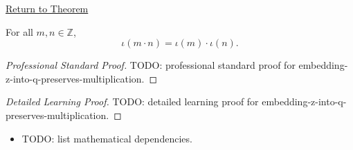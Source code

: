 \newpage
{}
\label{prf:embedding-z-into-q-preserves-multiplication}

\begin{remark*}[Return]
\hyperref[thm:embedding-z-into-q-preserves-multiplication]{Return to Theorem}
\end{remark*}

\begin{theorem*}
For all $m,n\in\mathbb{Z}$,
\[
\iota(m\cdot n)=\iota(m)\cdot\iota(n).
\]
\end{theorem*}

\begin{proof}[Professional Standard Proof]
\LRAProofBodyStart
TODO: professional standard proof for embedding-z-into-q-preserves-multiplication.
\end{proof}

\begin{proof}[Detailed Learning Proof]
\LRAProofBodyStart
TODO: detailed learning proof for embedding-z-into-q-preserves-multiplication.
\end{proof}

\begin{remark*}
\end{remark*}

\begin{dependencies}
\begin{itemize}
  \item TODO: list mathematical dependencies.
\end{itemize}
\end{dependencies}

\clearpage
